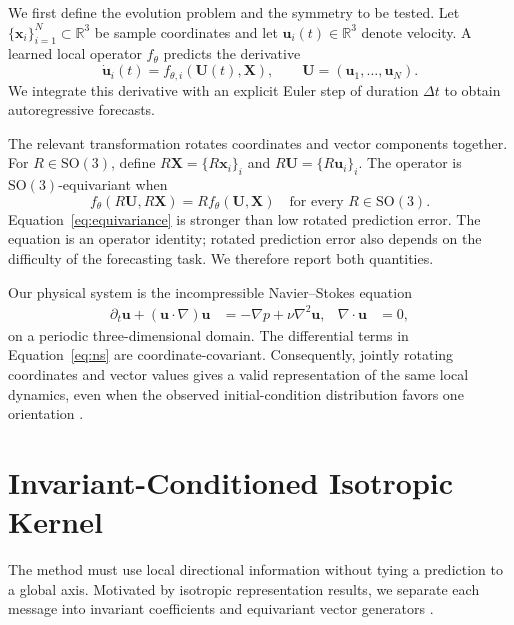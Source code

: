 \documentclass[mlmain]{jmlr}
\newcommand{\R}{\mathbb{R}}
\newcommand{\SO}{\mathrm{SO}(3)}
\begin{document}
We first define the evolution problem and the symmetry to be tested. Let
$\{\boldsymbol{x}_i\}_{i=1}^N\subset\R^3$ be sample coordinates and let
$\boldsymbol{u}_i(t)\in\R^3$ denote velocity. A learned local operator
$f_\theta$ predicts the derivative
\begin{equation}
  \dot{\boldsymbol{u}}_i(t)
  = f_{\theta,i}(\boldsymbol{U}(t),\boldsymbol{X}),
  \qquad
  \boldsymbol{U}=(\boldsymbol{u}_1,\ldots,\boldsymbol{u}_N).
  \label{eq:dynamics}
\end{equation}
We integrate this derivative with an explicit Euler step of duration
$\Delta t$ to obtain autoregressive forecasts.

The relevant transformation rotates coordinates and vector components
together. For $R\in\SO$, define
$R\boldsymbol{X}=\{R\boldsymbol{x}_i\}_i$ and
$R\boldsymbol{U}=\{R\boldsymbol{u}_i\}_i$. The operator is
$\SO$-equivariant when
\begin{equation}
 f_\theta(R\boldsymbol{U},R\boldsymbol{X})
 =R f_\theta(\boldsymbol{U},\boldsymbol{X})
 \quad\text{for every }R\in\SO.
 \label{eq:equivariance}
\end{equation}
Equation~\ref{eq:equivariance} is stronger than low rotated prediction error.
The equation is an operator identity; rotated prediction error also depends on the difficulty
of the forecasting task. We therefore report both quantities.

Our physical system is the incompressible Navier--Stokes equation
\begin{align}
 \partial_t\boldsymbol{u}
 +(\boldsymbol{u}\cdot\nabla)\boldsymbol{u}
 &=-\nabla p+\nu\nabla^2\boldsymbol{u},
 & \nabla\cdot\boldsymbol{u}&=0,
 \label{eq:ns}
\end{align}
on a periodic three-dimensional domain. The differential terms in
Equation~\ref{eq:ns} are coordinate-covariant. Consequently, jointly rotating
coordinates and vector values gives a valid representation of the same local
dynamics, even when the observed initial-condition distribution favors one
orientation \citep{olver1993applications,brandstetter2022lie}.

\section{Invariant-Conditioned Isotropic Kernel}
\label{sec:method}

The method must use local directional information without tying a prediction
to a global axis. Motivated by isotropic representation results, we separate
each message into invariant coefficients and equivariant vector generators
\citep{smith1971isotropic,villar2021scalars}.
\end{document}

